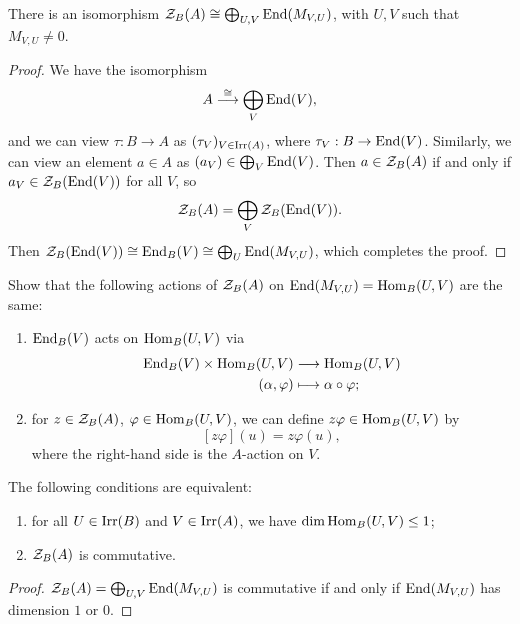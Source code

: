 \begin{lemma}
  There is an isomorphism
  $\mathcal{Z}_B(A) \cong \bigoplus_{U, V} \operatorname{End}(M_{V, U})$,
  with $U, V$ such that $M_{V, U} \ne 0$.
\end{lemma}

\begin{proof}
  We have the isomorphism
  \[
    A \overset{\cong}{\longrightarrow}
    \bigoplus_V \operatorname{End}(V),
  \]
  and we can view $\tau : B \to A$ as
  $(\tau_V)_{V \in \operatorname{Irr}(A)}$, where
  $\tau_V : B \to \operatorname{End}(V)$. Similarly,
  we can
  view an element $a \in A$ as $(a_V) \in \bigoplus_V \operatorname{End}(V)$.
  Then $a \in \mathcal{Z}_B(A)$ if and only if
  $a_V \in \mathcal{Z}_B(\operatorname{End}(V))$ for all $V$, so
  \[
    \mathcal{Z}_B(A)
    = \bigoplus_V \mathcal{Z}_B(\operatorname{End}(V)).
  \]
  Then
  $\mathcal{Z}_B(\operatorname{End}(V)) \cong \operatorname{End}_B(V) \cong \bigoplus_U \operatorname{End}(M_{V, U})$,
  which completes the proof.
\end{proof}

\begin{remark}
  Show that the following actions of
  $\mathcal{Z}_B(A)$ on
  $\operatorname{End}(M_{V, U}) = \operatorname{Hom}_B(U, V)$
  are the same:
  \begin{enumerate}
    \item $\operatorname{End}_B(V)$ acts on
      $\operatorname{Hom}_B(U, V)$ via
      \begin{align*}
        \operatorname{End}_B(V) \times \operatorname{Hom}_B(U, V)
        &\longrightarrow \operatorname{Hom}_B(U, V) \\
        (\alpha, \varphi) &\longmapsto \alpha \circ \varphi;
      \end{align*}
    \item for $z \in \mathcal{Z}_B(A)$,
      $\varphi \in \operatorname{Hom}_B(U, V)$,
      we can define $z \varphi \in \operatorname{Hom}_B(U, V)$
      by
      \[
        [z \varphi](u) = z \varphi(u),
      \]
      where the right-hand side is
      the $A$-action on $V$.
  \end{enumerate}
\end{remark}

\begin{corollary}
  The following conditions are equivalent:
  \begin{enumerate}
    \item for all $U \in \operatorname{Irr}(B)$
      and $V \in \operatorname{Irr}(A)$, we have
      $\dim \operatorname{Hom}_B(U, V) \le 1$;
    \item $\mathcal{Z}_B(A)$ is commutative.
  \end{enumerate}
\end{corollary}

\begin{proof}
  $\mathcal{Z}_B(A) = \bigoplus_{U, V} \operatorname{End}(M_{V, U})$ is
  commutative if and only if
  $\operatorname{End}(M_{V, U})$ has dimension
  $1$ or $0$.
\end{proof}

